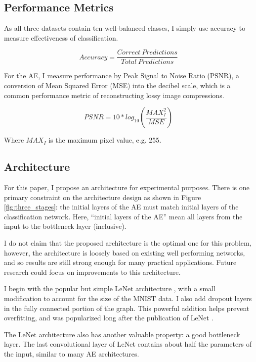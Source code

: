 \documentclass[twoside,11pt]{article}
\begin{document}
\subsection{Performance Metrics}

As all three datasets contain ten well-balanced classes, I simply use accuracy to measure
effectiveness of classification. 

\begin{equation}
Accuracy = \frac{Correct\ Predictions}{Total\ Predictions}
\end{equation}

For the AE, I measure performance by Peak Signal to Noise Ratio (PSNR), 
a conversion of Mean Squared Error (MSE) into the decibel scale, which is a common
performance metric of reconstructing lossy image compressions.

\begin{equation}
PSNR = 10*log_{10}\left(\frac{MAX^2_I}{MSE}\right)
\end{equation}

Where $MAX_I$ is the maximum pixel value, e.g. 255.


\subsection{Architecture}

For this paper, I propose an architecture for experimental purposes.
There is one primary constraint on the architecture design as shown in Figure \ref{fig:three_stages}:
the initial layers of the AE must match initial layers of the classification network.
Here, ``initial layers of the AE'' mean all layers from the input to the bottleneck layer (inclusive).

I do not claim that the proposed architecture is the optimal one for this problem,
however, the architecture is loosely based on existing well performing networks, and so 
results are still strong enough for many practical applications.
Future research could focus on improvements to this architecture.

I begin with the popular but simple LeNet architecture \cite{lecun1998gradient}
, with a small modification to account for the size of the MNIST data.
I also add dropout layers in the fully connected portion of the graph. 
This powerful addition helps prevent overfitting, and was popularized long
after the publication of LeNet \citep{srivastava2014dropout}.

The LeNet architecture also has another valuable property: a good bottleneck layer.
The last convolutional layer of LeNet contains about half the parameters of the input,
similar to many AE architectures. 
\end{document}
